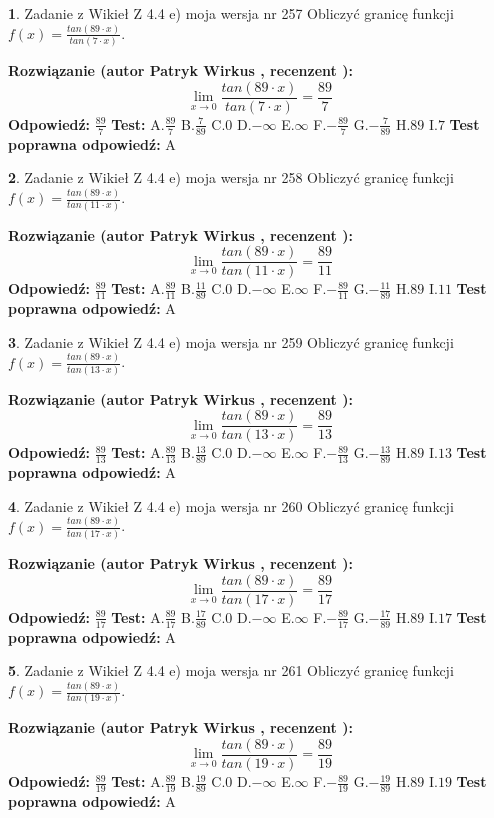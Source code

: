 \documentclass[12pt, a4paper]{article}
\theoremstyle{definition} %
\newtheorem{zad}{}
\newcommand{\zadStart}[1]{\begin{zad}#1\newline}
\newcommand{\zadStop}{\end{zad}}
\newcommand{\rozwStart}[2]{\noindent \textbf{Rozwiązanie (autor #1 , recenzent #2): }\newline}
\newcommand{\rozwStop}{\newline}
\newcommand{\odpStart}{\noindent \textbf{Odpowiedź:}\newline}
\newcommand{\odpStop}{\newline}
\newcommand{\testStart}{\noindent \textbf{Test:}\newline}
\newcommand{\testStop}{\newline}
\newcommand{\kluczStart}{\noindent \textbf{Test poprawna odpowiedź:}\newline}
\newcommand{\kluczStop}{\newline}
\begin{document}
\zadStart{Zadanie z Wikieł Z 4.4 e) moja wersja nr 257}
Obliczyć granicę funkcji $f(x)=\frac{tan(89\cdot x)}{tan(7\cdot x)}$.
\zadStop
\rozwStart{Patryk Wirkus}{}
$$\lim\limits_{x\to 0}\frac{tan(89\cdot x)}{tan(7\cdot x)}=
\frac{89}{7}$$
\rozwStop
\odpStart
$\frac{89}{7}$
\odpStop
\testStart
A.$\frac{89}{7}$
B.$\frac{7}{89}$
C.$0$
D.$-\infty$
E.$\infty$
F.$-\frac{89}{7}$
G.$-\frac{7}{89}$
H.$89$
I.$7$
\testStop
\kluczStart
A
\kluczStop



\zadStart{Zadanie z Wikieł Z 4.4 e) moja wersja nr 258}
Obliczyć granicę funkcji $f(x)=\frac{tan(89\cdot x)}{tan(11\cdot x)}$.
\zadStop
\rozwStart{Patryk Wirkus}{}
$$\lim\limits_{x\to 0}\frac{tan(89\cdot x)}{tan(11\cdot x)}=
\frac{89}{11}$$
\rozwStop
\odpStart
$\frac{89}{11}$
\odpStop
\testStart
A.$\frac{89}{11}$
B.$\frac{11}{89}$
C.$0$
D.$-\infty$
E.$\infty$
F.$-\frac{89}{11}$
G.$-\frac{11}{89}$
H.$89$
I.$11$
\testStop
\kluczStart
A
\kluczStop



\zadStart{Zadanie z Wikieł Z 4.4 e) moja wersja nr 259}
Obliczyć granicę funkcji $f(x)=\frac{tan(89\cdot x)}{tan(13\cdot x)}$.
\zadStop
\rozwStart{Patryk Wirkus}{}
$$\lim\limits_{x\to 0}\frac{tan(89\cdot x)}{tan(13\cdot x)}=
\frac{89}{13}$$
\rozwStop
\odpStart
$\frac{89}{13}$
\odpStop
\testStart
A.$\frac{89}{13}$
B.$\frac{13}{89}$
C.$0$
D.$-\infty$
E.$\infty$
F.$-\frac{89}{13}$
G.$-\frac{13}{89}$
H.$89$
I.$13$
\testStop
\kluczStart
A
\kluczStop



\zadStart{Zadanie z Wikieł Z 4.4 e) moja wersja nr 260}
Obliczyć granicę funkcji $f(x)=\frac{tan(89\cdot x)}{tan(17\cdot x)}$.
\zadStop
\rozwStart{Patryk Wirkus}{}
$$\lim\limits_{x\to 0}\frac{tan(89\cdot x)}{tan(17\cdot x)}=
\frac{89}{17}$$
\rozwStop
\odpStart
$\frac{89}{17}$
\odpStop
\testStart
A.$\frac{89}{17}$
B.$\frac{17}{89}$
C.$0$
D.$-\infty$
E.$\infty$
F.$-\frac{89}{17}$
G.$-\frac{17}{89}$
H.$89$
I.$17$
\testStop
\kluczStart
A
\kluczStop



\zadStart{Zadanie z Wikieł Z 4.4 e) moja wersja nr 261}
Obliczyć granicę funkcji $f(x)=\frac{tan(89\cdot x)}{tan(19\cdot x)}$.
\zadStop
\rozwStart{Patryk Wirkus}{}
$$\lim\limits_{x\to 0}\frac{tan(89\cdot x)}{tan(19\cdot x)}=
\frac{89}{19}$$
\rozwStop
\odpStart
$\frac{89}{19}$
\odpStop
\testStart
A.$\frac{89}{19}$
B.$\frac{19}{89}$
C.$0$
D.$-\infty$
E.$\infty$
F.$-\frac{89}{19}$
G.$-\frac{19}{89}$
H.$89$
I.$19$
\testStop
\kluczStart
A
\kluczStop
\end{document}
